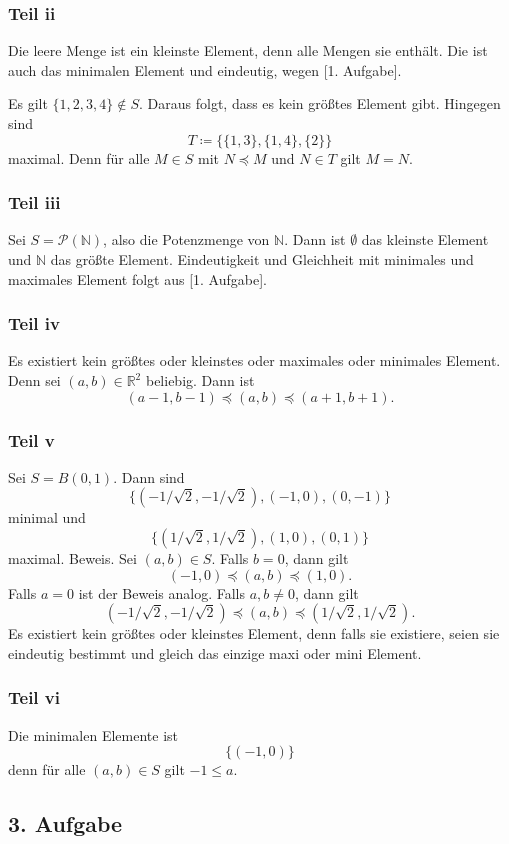 \documentclass[a5paper]{article}
\theoremstyle{remark}
\begin{document}
\subsubsection{Teil ii}
Die leere Menge ist ein kleinste Element, denn alle Mengen
sie enthält.  Die ist auch das minimalen Element und
eindeutig, wegen [1. Aufgabe].

Es gilt \(\{1, 2, 3, 4\} \notin S\).  Daraus folgt, dass es kein größtes
Element gibt.   Hingegen sind
\[ T \coloneq \{\{1, 3\}, \{1, 4\}, \{2\}\}\]
maximal.  Denn für alle \(M \in S\) mit \(N \preceq M\) und \(N \in T\) gilt \(M = N\).
\subsubsection{Teil iii}
Sei \(S = \mathcal{P}(\mathbb{N})\), also die Potenzmenge von \(\mathbb{N}\).  Dann ist \(\emptyset\) das
kleinste Element und \(\mathbb{N}\) das größte Element.  Eindeutigkeit und
Gleichheit mit minimales und maximales Element folgt aus [1. Aufgabe].
\subsubsection{Teil iv}
Es existiert kein größtes oder kleinstes oder maximales oder minimales
Element.  Denn sei \((a, b) \in \mathbb{R}^{2}\) beliebig.  Dann ist
\[ (a-1, b-1) \preceq (a,b) \preceq (a+1, b+1).\]

\subsubsection{Teil v}
Sei \(S = B(0, 1)\).  Dann sind
\[\{(-1/\sqrt2,-1/\sqrt2), (-1,0),(0,-1)\}\]
minimal und
\[\{(1/\sqrt2,1/\sqrt2), (1,0),(0,1)\}\]
maximal.  Beweis.  Sei \((a, b) \in S\).  Falls \(b = 0\), dann gilt
\[(-1, 0)\preceq(a, b)\preceq(1, 0).\]
Falls \(a = 0\) ist der Beweis analog.  Falls \(a, b \ne 0\), dann gilt
\[(-1/\sqrt2,-1/\sqrt2) \preceq (a, b) \preceq (1/\sqrt2,1/\sqrt2).\]
Es existiert kein größtes oder kleinstes Element, denn falls
sie existiere, seien sie eindeutig bestimmt und gleich das einzige
maxi oder mini Element.
\subsubsection{Teil vi}
Die minimalen Elemente ist
\[\{(-1, 0)\}\]
denn für alle \((a, b) \in S\) gilt \(-1 \le a\).

\subsection{3. Aufgabe}
\end{document}
